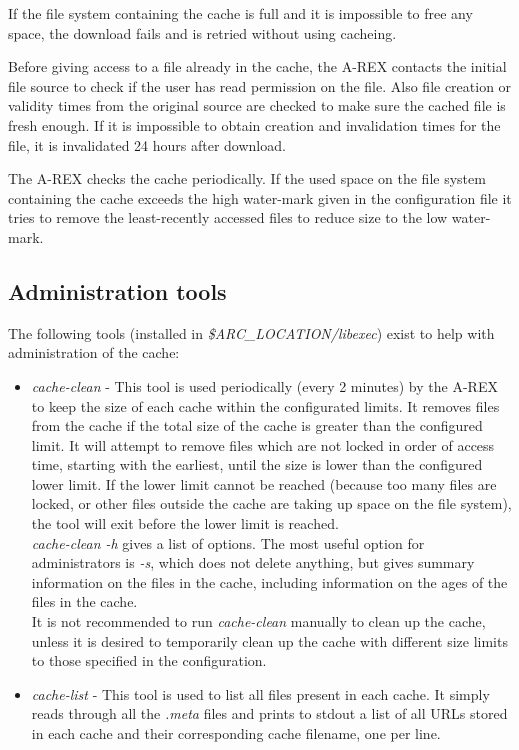 \documentclass{article}                            %
\begin{document}
If the file system containing the cache is full and it is impossible
to free any space, the download fails and is retried without using
cacheing.

Before giving access to a file already in the cache, the A-REX contacts
the initial file source to check if the user has read permission on
the file. Also file creation or validity times from the original source
are checked to make sure the cached file is fresh enough. If it is
impossible to obtain creation and invalidation times for the file,
it is invalidated 24 hours after download.

The A-REX checks the cache periodically. If the used space on the file
system containing the cache exceeds the high water-mark given in the
configuration file it tries to remove the least-recently accessed
files to reduce size to the low water-mark.


\subsection{Administration tools}

The following tools (installed in \emph{\$ARC\_LOCATION/libexec})
exist to help with administration of the cache:

\begin{itemize}
\item \emph{cache-clean} - This tool is used periodically (every 2 minutes)
by the A-REX to keep the size of each cache within the configurated limits.
It removes files from the cache if the total size of the cache is
greater than the configured limit. It will attempt to remove files
which are not locked in order of access time, starting with the earliest,
until the size is lower than the configured lower limit. If the lower
limit cannot be reached (because too many files are locked, or other
files outside the cache are taking up space on the file system), the
tool will exit before the lower limit is reached.\\
\emph{cache-clean -h} gives a list of options. The most useful option
for administrators is \emph{-s}, which does not delete anything, but
gives summary information on the files in the cache, including information
on the ages of the files in the cache.\\
It is not recommended to run \emph{cache-clean }manually to clean
up the cache, unless it is desired to temporarily clean up the cache
with different size limits to those specified in the configuration.
\item \emph{cache-list} - This tool is used to list all files present in
each cache. It simply reads through all the \emph{.meta }files and
prints to stdout a list of all URLs stored in each cache and their
corresponding cache filename, one per line.
\end{itemize}
\end{document}
